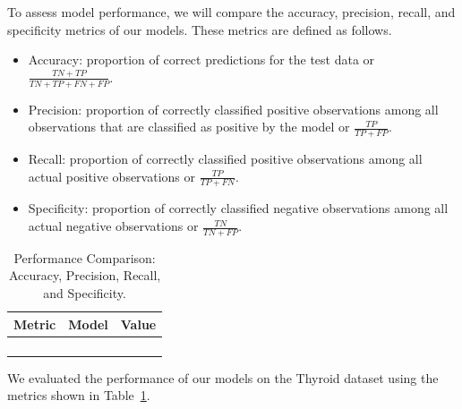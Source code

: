 \documentclass[
  letterpaper,
  DIV=11,
  numbers=noendperiod]{scrartcl}
\begin{document}
To assess model performance, we will compare the accuracy, precision,
recall, and specificity metrics of our models. These metrics are defined
as follows.

\begin{itemize}
\item
  Accuracy: proportion of correct predictions for the test data or
  \(\frac{TN + TP}{TN + TP + FN + FP}\).
\item
  Precision: proportion of correctly classified positive observations
  among all observations that are classified as positive by the model or
  \(\frac{TP}{TP + FP}\).
\item
  Recall: proportion of correctly classified positive observations among
  all actual positive observations or \(\frac{TP}{TP + FN}\).
\item
  Specificity: proportion of correctly classified negative observations
  among all actual negative observations or \(\frac{TN}{TN + FP}\).
\end{itemize}

\begin{longtable}{>{\raggedright\arraybackslash}p{}>{\raggedright\arraybackslash}p{}>{\raggedleft\arraybackslash}p{}}

\caption{\label{tbl-overall-performance}Performance Comparison:
Accuracy, Precision, Recall, and Specificity.}

\tabularnewline

\toprule
Metric & Model & Value \\ 
\midrule\addlinespace[2.5pt]
\cellcolor[HTML]{FFFFFF}{Accuracy} & \cellcolor[HTML]{FFFFFF}{Random Forest} & \cellcolor[HTML]{FFFFFF}{94\%} \\ 
\cellcolor[HTML]{FFFFFF}{Precision} & \cellcolor[HTML]{FFFFFF}{ANN, Logistic Regression, Random Forest} & \cellcolor[HTML]{FFFFFF}{85\%} \\ 
\cellcolor[HTML]{FFFFFF}{Recall} & \cellcolor[HTML]{FFFFFF}{SVM} & \cellcolor[HTML]{FFFFFF}{100\%} \\ 
\cellcolor[HTML]{FFFFFF}{Specificity} & \cellcolor[HTML]{FFFFFF}{Random Forest} & \cellcolor[HTML]{FFFFFF}{94\%} \\ 
\bottomrule

\end{longtable}

We evaluated the performance of our models on the Thyroid dataset using
the metrics shown in Table~\ref{tbl-overall-performance}.
\end{document}
